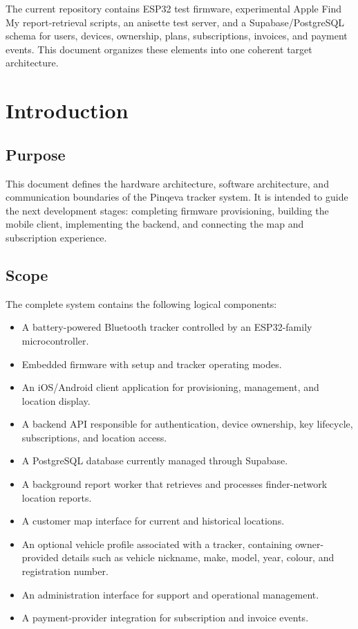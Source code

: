 \documentclass[12pt,a4paper]{article}
\begin{document}
The current repository contains ESP32 test firmware, experimental Apple Find My
report-retrieval scripts, an anisette test server, and a Supabase/PostgreSQL
schema for users, devices, ownership, plans, subscriptions, invoices, and
payment events. This document organizes these elements into one coherent target
architecture.

\clearpage
\tableofcontents
\clearpage

\section{Introduction}

\subsection{Purpose}

This document defines the hardware architecture, software architecture, and
communication boundaries of the Pinqeva tracker system. It is intended to guide
the next development stages: completing firmware provisioning, building the
mobile client, implementing the backend, and connecting the map and
subscription experience.

\subsection{Scope}

The complete system contains the following logical components:

\begin{itemize}
    \item A battery-powered Bluetooth tracker controlled by an ESP32-family
    microcontroller.
    \item Embedded firmware with setup and tracker operating modes.
    \item An iOS/Android client application for provisioning, management, and
    location display.
    \item A backend API responsible for authentication, device ownership, key
    lifecycle, subscriptions, and location access.
    \item A PostgreSQL database currently managed through Supabase.
    \item A background report worker that retrieves and processes
    finder-network location reports.
    \item A customer map interface for current and historical locations.
    \item An optional vehicle profile associated with a tracker, containing
    owner-provided details such as vehicle nickname, make, model, year, colour,
    and registration number.
    \item An administration interface for support and operational management.
    \item A payment-provider integration for subscription and invoice events.
\end{itemize}
\end{document}
